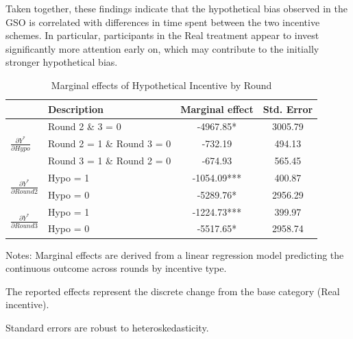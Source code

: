 \documentclass[12pt]{article}
\begin{document}
Taken together, these findings indicate that the hypothetical bias observed in the GSO is correlated with differences in time spent between the two incentive schemes. In particular, participants in the Real treatment appear to invest significantly more attention early on, which may contribute to the initially stronger hypothetical bias.

\begin{table}[H]
\centering
\footnotesize
\caption{Marginal effects of Hypothetical Incentive by Round}
\label{tab: Marginal Effects by Round}
\begin{tabular}{llcc}
\toprule
 & Description & Marginal effect & Std. Error \\
 \midrule
\multirow{3}{*}{$\frac{\partial Y^*}{\partial Hypo}$} 
    & Round 2 \& 3 = 0 & -4967.85* & 3005.79 \\
    & Round 2 = 1 \& Round 3 = 0 & -732.19 & 494.13 \\
    & Round 3 = 1 \& Round 2 = 0 & -674.93 & 565.45 \\
\midrule
\multirow{2}{*}{$\frac{\partial Y^*}{\partial Round2}$} 
    & Hypo = 1 & -1054.09*** & 400.87 \\
    & Hypo = 0 & -5289.76* & 2956.29 \\
\midrule
\multirow{2}{*}{$\frac{\partial Y^*}{\partial Round3}$} 
    & Hypo = 1 & -1224.73*** & 399.97 \\
    & Hypo = 0 & -5517.65* & 2958.74 \\
\bottomrule
\end{tabular}
\begin{tablenotes}
\footnotesize
\item Notes: Marginal effects are derived from a linear regression model predicting the continuous outcome across rounds by incentive type.
\item The reported effects represent the discrete change from the base category (Real incentive).
\item Standard errors are robust to heteroskedasticity.
\end{tablenotes}
\end{table}





 
\end{document}
